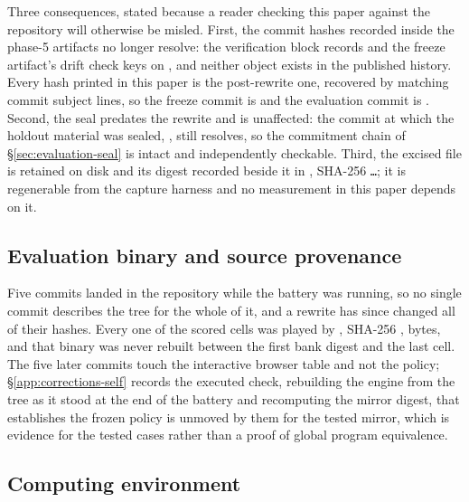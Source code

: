 Three consequences, stated because a reader checking this paper against the repository will otherwise
be misled. First, the commit hashes recorded inside the phase-5 artifacts no longer resolve:
the verification block records \texttt{\vsevenBzeroCommitRecorded{}} and the freeze artifact's drift
check keys on \texttt{\vsevenFreezeCommitRecorded{}}, and neither object exists in the published
history. Every hash printed in this paper is the post-rewrite one, recovered by matching commit
subject lines, so the freeze commit is \texttt{\vsevenFreezeCommit{}} and the evaluation commit is
\texttt{\vsevenBzeroCommit{}}. Second, the seal predates the rewrite and is unaffected: the commit at
which the holdout material was sealed, \texttt{\vsevenSealCommit{}}, still resolves, so the
commitment chain of \S\ref{sec:evaluation-seal} is intact and independently checkable. Third, the
excised file is retained on disk and its digest recorded beside it in
, SHA-256
\texttt{\vsevenKfiveDigest{}\ldots}; it is regenerable from the capture harness and no measurement in
this paper depends on it.

\subsection*{Evaluation binary and source provenance}

Five commits landed in the repository while the battery was running, so no single commit describes
the tree for the whole of it, and a rewrite has since changed all of their hashes. Every one of the
\vsevenScoredCells{} scored cells was played by , SHA-256
\expandafter\hexdigest\expandafter{\vsevenBinarySha}, \vsevenBinaryBytes{} bytes, and that binary
was never rebuilt between the first bank digest and the last cell. The five later commits touch the
interactive browser table and not the policy; \S\ref{app:corrections-self} records the executed
check, rebuilding the engine from the tree as it stood at the end of the battery and recomputing the
mirror digest, that establishes the frozen policy is unmoved by them for the tested mirror, which is
evidence for the tested cases rather than a proof of global program equivalence.

\subsection*{Computing environment}

